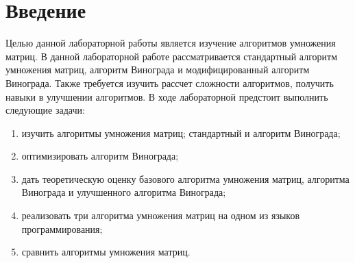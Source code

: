 \documentclass[a4paper, 12pt]{article}
\begin{document}
\tableofcontents
\clearpage
\newpage

\section*{Введение}

\begin{flushleft}
	\hspace*{5mm} Целью данной лабораторной работы является изучение алгоритмов умножения матриц. В данной лабораторной работе рассматривается стандартный алгоритм умножения матриц, алгоритм Винограда и модифицированный алгоритм Винограда. Также требуется изучить рассчет сложности алгоритмов, получить навыки в улучшении алгоритмов. 
	\newline \hspace*{5mm} В ходе лабораторной предстоит выполнить следующие задачи: 
	\begin{enumerate}
		\item изучить алгоритмы умножения матриц; стандартный и алгоритм Винограда;
		\item оптимизировать алгоритм Винограда;
		\item дать теоретическую оценку базового алгоритма умножения матриц, алгоритма Винограда и улучшенного алгоритма Винограда;
		\item реализовать три алгоритма умножения матриц на одном из языков программирования;
		\item сравнить алгоритмы умножения матриц.
    \end{enumerate}
		
\end{flushleft}
\clearpage
\newpage
\end{document}
